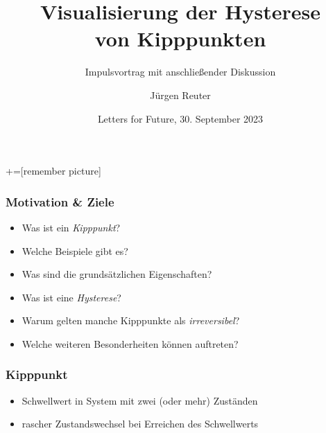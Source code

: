 \documentclass{beamer}
\title[Kipppunkte]{
  Visualisierung der Hysterese\\
  von Kipppunkten}
\subtitle{Impulsvortrag mit anschließender Diskussion}
\author{Jürgen Reuter}
\institute[\tt{soundpaint.org}]{\tt{soundpaint.org}}
\date[LFF2023]{Letters for Future, 30. September 2023}
\begin{document}
+=[remember picture]
\everymath{\displaystyle}

\frame{\titlepage}



\begin{frame}
  \frametitle{Motivation \& Ziele}
  \begin{itemize}
  \item<2->  Was ist ein {\em Kipppunkt}?
  \item<3->  Welche Beispiele gibt es?
  \item<4->  Was sind die grundsätzlichen Eigenschaften?
  \item<5->  Was ist eine {\em Hysterese}?
  \item<6->  Warum gelten manche Kipppunkte als {\em irreversibel}?
  \item<7->  Welche weiteren Besonderheiten können auftreten?
  \end{itemize}
\end{frame}

\begin{frame}
  \frametitle{Kipppunkt}
  \begin{itemize}
  \item<2->  Schwellwert in System mit zwei (oder mehr) Zuständen
  \item<3->  rascher Zustandswechsel bei Erreichen des Schwellwerts
  \end{itemize}
\end{frame}
\end{document}
